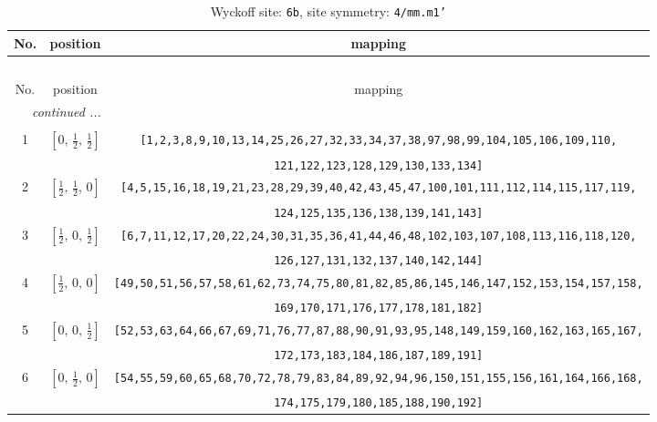\documentclass[fleqn,8pt]{jsarticle}
\begin{document}
\begin{longtable}{ccc}
\caption{Wyckoff site: {\tt 6b}, site symmetry: {\tt 4/mm.m1'}}
 \\
 \hline \hline
No. & position & mapping \\ \hline \endfirsthead

\multicolumn{2}{l}{\tablename\ \thetable{}} \\
 \hline \hline
No. & position & mapping \\ \hline \endhead

 \hline \hline
\multicolumn{2}{r}{\footnotesize\it continued ...} \\ \endfoot

 \hline \hline
\multicolumn{2}{r}{} \\ \endlastfoot

1 & $\left[ 0,\, \frac{1}{2},\, \frac{1}{2} \right]$ & {\tt [1,2,3,8,9,10,13,14,25,26,27,32,33,34,37,38,97,98,99,104,105,106,109,110,} \\ \hline
 &  & {\tt 121,122,123,128,129,130,133,134]} \\ \hline
2 & $\left[ \frac{1}{2},\, \frac{1}{2},\, 0 \right]$ & {\tt [4,5,15,16,18,19,21,23,28,29,39,40,42,43,45,47,100,101,111,112,114,115,117,119,} \\ \hline
 &  & {\tt 124,125,135,136,138,139,141,143]} \\ \hline
3 & $\left[ \frac{1}{2},\, 0,\, \frac{1}{2} \right]$ & {\tt [6,7,11,12,17,20,22,24,30,31,35,36,41,44,46,48,102,103,107,108,113,116,118,120,} \\ \hline
 &  & {\tt 126,127,131,132,137,140,142,144]} \\ \hline
4 & $\left[ \frac{1}{2},\, 0,\, 0 \right]$ & {\tt [49,50,51,56,57,58,61,62,73,74,75,80,81,82,85,86,145,146,147,152,153,154,157,158,} \\ \hline
 &  & {\tt 169,170,171,176,177,178,181,182]} \\ \hline
5 & $\left[ 0,\, 0,\, \frac{1}{2} \right]$ & {\tt [52,53,63,64,66,67,69,71,76,77,87,88,90,91,93,95,148,149,159,160,162,163,165,167,} \\ \hline
 &  & {\tt 172,173,183,184,186,187,189,191]} \\ \hline
6 & $\left[ 0,\, \frac{1}{2},\, 0 \right]$ & {\tt [54,55,59,60,65,68,70,72,78,79,83,84,89,92,94,96,150,151,155,156,161,164,166,168,} \\ \hline
 &  & {\tt 174,175,179,180,185,188,190,192]} \\
\end{longtable}
\renewcommand{\arraystretch}{1.2}
\end{document}
